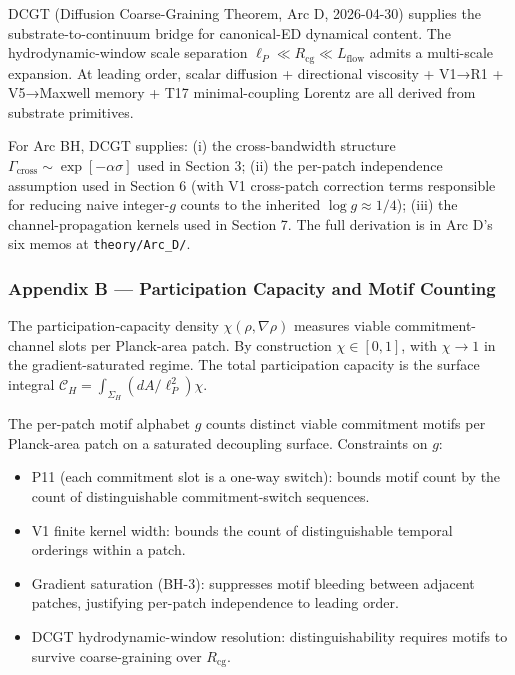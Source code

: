 \documentclass[
  11pt,
  a4paper,
]{article}
\providecommand{\tightlist}{%
  \setlength{\itemsep}{0pt}\setlength{\parskip}{0pt}}
\begin{document}
DCGT (Diffusion Coarse-Graining Theorem, Arc D, 2026-04-30) supplies the
substrate-to-continuum bridge for canonical-ED dynamical content. The
hydrodynamic-window scale separation
\(\ell_P \ll R_\mathrm{cg} \ll L_\mathrm{flow}\) admits a multi-scale
expansion. At leading order, scalar diffusion + directional viscosity +
V1→R1 + V5→Maxwell memory + T17 minimal-coupling Lorentz are all derived
from substrate primitives.

For Arc BH, DCGT supplies: (i) the cross-bandwidth structure
\(\Gamma_\mathrm{cross} \sim \exp[-\alpha\sigma]\) used in Section 3;
(ii) the per-patch independence assumption used in Section 6 (with V1
cross-patch correction terms responsible for reducing naive
integer-\(g\) counts to the inherited \(\log g \approx 1/4\)); (iii) the
channel-propagation kernels used in Section 7. The full derivation is in
Arc D's six memos at \texttt{theory/Arc\_D/}.

\subsubsection{Appendix B --- Participation Capacity and Motif
Counting}\label{appendix-b-participation-capacity-and-motif-counting}

The participation-capacity density \(\chi(\rho,\nabla\rho)\) measures
viable commitment-channel slots per Planck-area patch. By construction
\(\chi \in [0,1]\), with \(\chi \to 1\) in the gradient-saturated
regime. The total participation capacity is the surface integral
\(\mathcal{C}_H = \int_{\Sigma_H}(dA/\ell_P^2)\chi\).

The per-patch motif alphabet \(g\) counts distinct viable commitment
motifs per Planck-area patch on a saturated decoupling surface.
Constraints on \(g\):

\begin{itemize}
\tightlist
\item
  P11 (each commitment slot is a one-way switch): bounds motif count by
  the count of distinguishable commitment-switch sequences.
\item
  V1 finite kernel width: bounds the count of distinguishable temporal
  orderings within a patch.
\item
  Gradient saturation (BH-3): suppresses motif bleeding between adjacent
  patches, justifying per-patch independence to leading order.
\item
  DCGT hydrodynamic-window resolution: distinguishability requires
  motifs to survive coarse-graining over \(R_\mathrm{cg}\).
\end{itemize}
\end{document}
